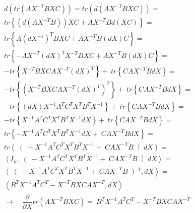 \begin{gather*}
d(tr(AX^{-T}BXC)) = 
tr(d(AX^{-T}BXC)) = \\
tr\left\lbrace (d(AX^{-T}B))XC + AX^{-T}Bd(XC) \right\rbrace  = \\
tr\left\lbrace A(dX^{-1})^TBXC + AX^{-T}B(dX)C \right\rbrace  = \\
tr\left\lbrace -AX^{-T}(dX)^TX^{-T}BXC + AX^{-T}B(dX)C \right\rbrace  = \\
-tr\left\lbrace X^{-T}BXCAX^{-T}(dX)^T \right\rbrace + \
tr\left\lbrace CAX^{-T}BdX           \right\rbrace  = \\
-tr\left\lbrace (X^{-T}BXCAX^{-T}(dX)^T)^T \right\rbrace + \
tr\left\lbrace CAX^{-T}BdX           \right\rbrace  = \\
-tr\left\lbrace (dX)X^{-1}A^TC^TX^TB^TX^{-1} \right\rbrace + \
tr\left\lbrace CAX^{-T}BdX           \right\rbrace  = \\
-tr\left\lbrace X^{-1}A^TC^TX^TB^TX^{-1}dX \right\rbrace + \
tr\left\lbrace CAX^{-T}BdX           \right\rbrace  = \\
tr\left\lbrace -X^{-1}A^TC^TX^TB^TX^{-1}dX + \
CAX^{-T}BdX           \right\rbrace  = \\
tr\left\lbrace \right(-X^{-1}A^TC^TX^TB^TX^{-1} + \
CAX^{-T}B \left) dX           \right\rbrace  = \\
\left< I_n, \right(-X^{-1}A^TC^TX^TB^TX^{-1} + \
CAX^{-T}B \left) dX \right> = \\
\left< \right(-X^{-1}A^TC^TX^TB^TX^{-1} + \
CAX^{-T}B \left)^T, dX \right> = \\
\left< B^TX^{-1}A^TC^T - X^{-T}BXCAX^{-T} , dX \right> \\
\rightarrow \quad \dfrac{\partial}{\partial X} tr(AX^{-T}BXC) = \
B^TX^{-1}A^TC^T - X^{-T}BXCAX^{-T}
\end{gather*}